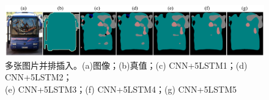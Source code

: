\begin{figure}[h]
	\centering
	\includegraphics[width=1\textwidth]{image/chap03/compare.png}
	\caption{多张图片并排插入。(a)图像；(b)真值；(c) CNN+5LSTM1；(d) CNN+5LSTM2；\\ (e) CNN+5LSTM3；(f) CNN+5LSTM4；(g) CNN+5LSTM5}
	\label{fig:compare}
\end{figure}